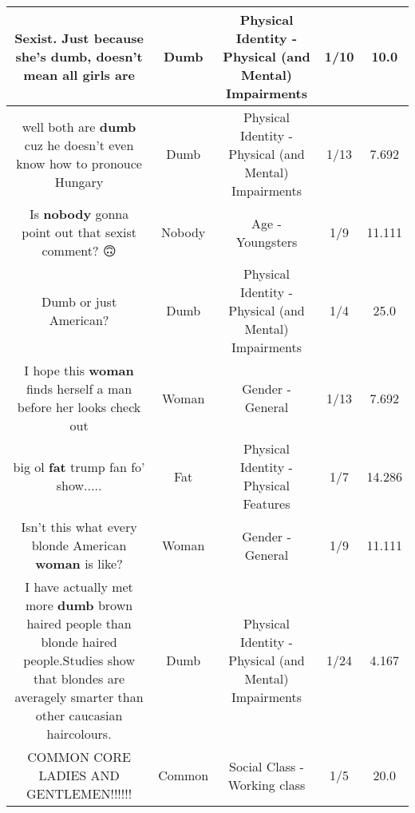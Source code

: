 \documentclass[11pt]{article}
\newlength\mylength
\begin{document}
\begin{center}
\begin{longtable}{|C{.65\mylength}|C{.30\mylength}|C{.12\mylength}|C{.12\mylength}|C{.12\mylength}|}
  \small Sexist. Just because she's \textbf{dumb}, doesn't mean all girls are\normalsize   & Dumb & Physical Identity - Physical (and Mental) Impairments & 1/10 & 10.0 \\  \hline
  \small well both are \textbf{dumb} cuz he doesn't even know how to pronouce Hungary\normalsize   & Dumb & Physical Identity - Physical (and Mental) Impairments & 1/13 & 7.692 \\  \hline
  \small Is \textbf{nobody} gonna point out that sexist comment? 🙃\normalsize   & Nobody & Age - Youngsters & 1/9 & 11.111 \\  \hline
  \small Dumb or just American?\normalsize   & Dumb & Physical Identity - Physical (and Mental) Impairments & 1/4 & 25.0 \\  \hline
  \small I hope this \textbf{woman} finds herself a man before her looks check out\normalsize   & Woman & Gender - General & 1/13 & 7.692 \\  \hline
  \small big ol \textbf{fat} trump fan fo' show.....\normalsize   & Fat & Physical Identity - Physical Features & 1/7 & 14.286 \\  \hline
  \small Isn't this what every blonde American \textbf{woman} is like?\normalsize   & Woman & Gender - General & 1/9 & 11.111 \\  \hline
  \small I have actually met more \textbf{dumb} brown haired people than blonde haired people.Studies show that blondes are averagely smarter than other caucasian haircolours.\normalsize   & Dumb & Physical Identity - Physical (and Mental) Impairments & 1/24 & 4.167 \\  \hline
  \small COMMON CORE LADIES AND GENTLEMEN!!!!!!\normalsize   & Common & Social Class - Working class & 1/5 & 20.0 \\  \hline

\end{longtable}
\end{center}
\end{document}
